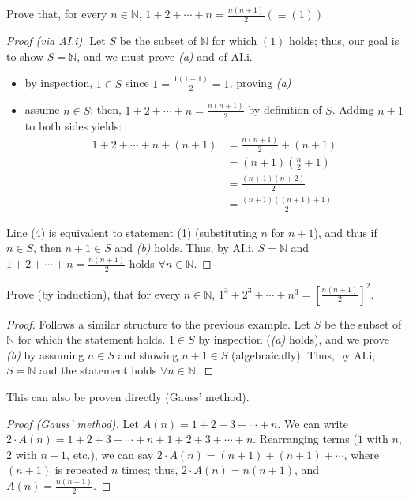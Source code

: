 \documentclass[12pt]{article}
\begin{document}
\begin{example}\label{example:ai.i}
  Prove that, for every $n \in \mathbb{N}$, $1 + 2 + \cdots + n = \frac{n(n+1)}{2} (\equiv (1))$
  \begin{proof}[Proof (via AI.i)]
    Let $S$ be the subset of $\mathbb{N}$ for which $(1)$ holds; thus, our goal is to show $S = \mathbb{N}$, and we must prove \textit{(a)} and  of AI.i.
    \begin{itemize}
      \item by inspection, $1 \in S$ since $1 = \frac{1(1+1)}{2} = 1$, proving \textit{(a)}
      \item assume $n \in S$; then, $1 + 2 + \cdots + n = \frac{n(n+1)}{2}$ by definition of $S$. Adding $n+1$ to both sides yields:
      \begin{align}
        1 + 2 + \cdots + n + (n+1) &= \frac{n(n+1)}{2} + (n+1) \\
        &= (n+1)(\frac{n}{2}+1) \\
        &= \frac{(n+1)(n+2)}{2} \\
        &= \frac{(n+1)((n+1)+1)}{2}
      \end{align}
    \end{itemize}
    Line (4) is equivalent to statement (1) (substituting $n$ for $n+1$), and thus if $n \in S$, then $n+1 \in S$ and \textit{(b)} holds. Thus, by AI.i, $S = \mathbb{N}$ and $1 + 2 + \cdots + n = \frac{n(n+1)}{2}$ holds $\forall n \in \mathbb{N}$.
  \end{proof}
\end{example}

\begin{example}
  Prove (by induction), that for every $n \in \mathbb{N}$, $1^3 + 2^3 + \cdots + n^3 = \left[\frac{n(n+1)}{2}\right]^2$.
  \begin{proof}
    Follows a similar structure to the previous example. Let $S$ be the subset of $\mathbb{N}$ for which the statement holds. $1 \in S$ by inspection (\textit{(a)} holds), and we prove \textit{(b)} by assuming $n \in S$ and showing $n+1 \in S$ (algebraically). Thus, by AI.i, $S = \mathbb{N}$ and the statement holds $\forall n \in \mathbb{N}$.
  \end{proof}
  This can also be proven directly (Gauss' method).
\begin{proof}[Proof (Gauss' method)]
  Let $A(n) = 1 + 2 + 3 + \cdots + n$. We can write $2 \cdot A(n) = 1 + 2 + 3 + \cdots + n + 1 + 2 + 3 + \cdots + n$. Rearranging terms ($1$ with $n$, $2$ with $n - 1$, etc.), we can say $2\cdot A(n) = (n+1)+(n+1)+\cdots$, where $(n+1)$ is repeated $n$ times; thus, $2\cdot A(n) = n(n+1)$, and $A(n) = \frac{n(n+1)}{2}$.
\end{proof}
\end{example}
\end{document}
